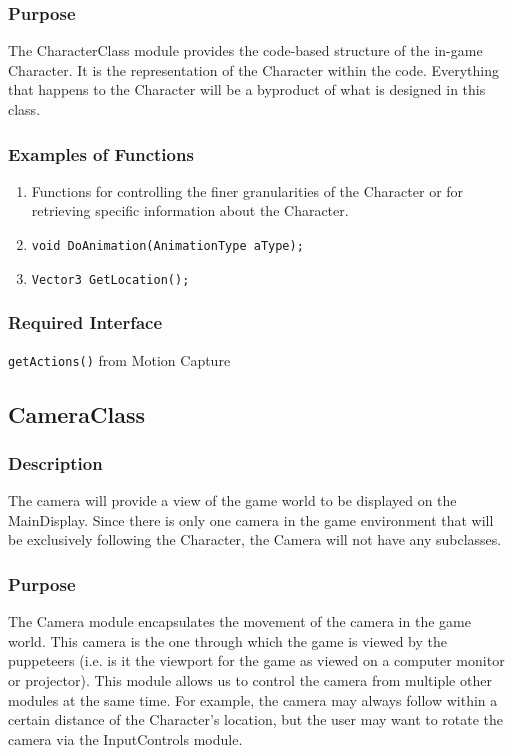 \documentclass[10pt,letterpaper,oneside,english]{article}
\newcommand{\code}[1]{\texttt{#1}}
\newcommand{\citem}[1]{\item \code{#1}}
\begin{document}
\subsubsection{Purpose}
	The CharacterClass module provides the code-based structure of the in-game Character. It is the representation of the Character within the code. Everything that happens to the Character will be a byproduct of what is designed in this class.

\subsubsection{Examples of Functions}
\begin{enumerate}
		\item Functions for controlling the finer granularities of the Character or for retrieving specific information about the Character.
		\citem {void DoAnimation(AnimationType aType);}
		\citem {Vector3 GetLocation();}
	\end{enumerate}

\subsubsection{Required Interface}
	\code{getActions()} from Motion Capture

\subsection{CameraClass}

\subsubsection{Description}
The camera will provide a view of the game world to be displayed on the MainDisplay. Since there is only one camera in the game environment that will be exclusively following the Character, the Camera will not have any subclasses.

\subsubsection{Purpose}
	The Camera module encapsulates the movement of the camera in the game world. This camera is the one through which the game is viewed by the puppeteers (i.e. is it the viewport for the game as viewed on a computer monitor or projector). This module allows us to control the camera from multiple other modules at the same time. For example, the camera may always follow within a certain distance of the Character’s location, but the user may want to rotate the camera via the InputControls module. 
\end{document}
